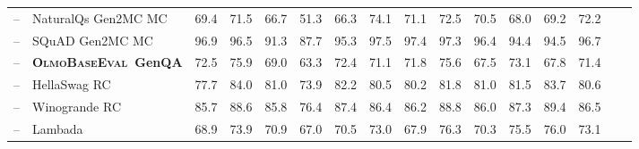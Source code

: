 \documentclass[table]{ai2style/ai2}
\newcommand{\olmothreeeval}{\textsc{OlmoBaseEval}\xspace}
\begin{document}
\begin{table}[t]
{{\begin{NiceTabular}{@{}Hl
P{35pt}C{35pt}C{35pt}C{35pt}C{35pt}|C{35pt}C{35pt}C{35pt}C{35pt}C{35pt}C{35pt}C{35pt}C{35pt}C{35pt}@{}}
 -- & NaturalQs Gen2MC MC                                                                                    & 69.4                   & 71.5              & 66.7                & 51.3                & 66.3                 & 74.1              & 71.1                   & 72.5                & 70.5                 & 68.0                  & 69.2                    & 72.2             \\
 -- & SQuAD Gen2MC MC                                                                                        & 96.9                   & 96.5              & 91.3                & 87.7                & 95.3                 & 97.5              & 97.4                   & 97.3                & 96.4                 & 94.4                  & 94.5                    & 96.7             \\
\midrule
{}   -- & {\textbf{\olmothreeeval \fontsize{9}{9}\selectfont~GenQA}}                                             & 72.5                   & 75.9              & 69.0                & 63.3                & 72.4                 & 71.1              & 71.8                   & 75.6                & 67.5                 & 73.1                  & 67.8                    & 71.4             \\
 -- & HellaSwag RC                                                                                           & 77.7                   & 84.0              & 81.0                & 73.9                & 82.2                 & 80.5              & 80.2                   & 81.8                & 81.0                 & 81.5                  & 83.7                    & 80.6             \\
 -- & Winogrande RC                                                                                          & 85.7                   & 88.6              & 85.8                & 76.4                & 87.4                 & 86.4              & 86.2                   & 88.8                & 86.0                 & 87.3                  & 89.4                    & 86.5             \\
 -- & Lambada                                                                                                & 68.9                   & 73.9              & 70.9                & 67.0                & 70.5                 & 73.0              & 67.9                   & 76.3                & 70.3                 & 75.5                  & 76.0                    & 73.1             \\

\end{NiceTabular}}}
\end{table}
\end{document}
